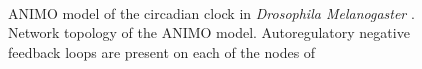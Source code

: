 \begin{figure}[!htpb]
\begin{center}
\ %
{}\ 
\end{center}
\caption{ANIMO model of the circadian clock in \emph{Drosophila Melanogaster} {\bfseries \protect{}}.
Network topology of the ANIMO model. Autoregulatory negative feedback loops are present on each of the nodes of 
}
\end{figure}

